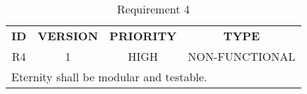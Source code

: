 \documentclass[11pt,a4paper]{report}
\theoremstyle{definition}
\theoremstyle{remark}
\begin{document}
            \begin{table}[ht]
            \centering
                \begin{tabular}{cccc} %
                    \textbf{ID} & \textbf{VERSION} & \textbf{PRIORITY} & \textbf{TYPE}\\
                            R4  &           1      &           HIGH    &      NON-FUNCTIONAL\\
                    \hline
                    \multicolumn{4}{l}{Eternity shall be modular and testable.}
                \end{tabular}
                \caption{Requirement 4}
                \label{tab:table-requirements-4}
            \end{table}
            \vspace{3em}
\end{document}
